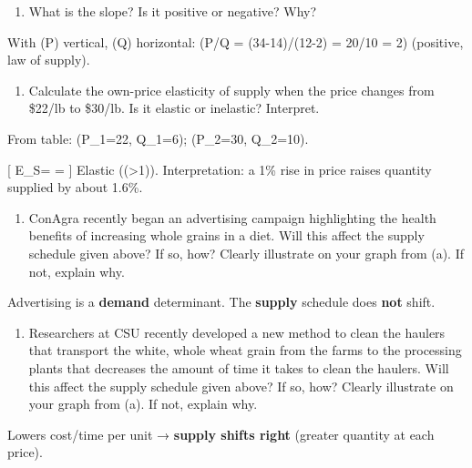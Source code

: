 \documentclass[
  letterpaper,
  DIV=11,
  numbers=noendperiod]{scrartcl}
\providecommand{\tightlist}{%
  \setlength{\itemsep}{0pt}\setlength{\parskip}{0pt}}
\begin{document}
\begin{enumerate}
\def\labelenumi{\alph{enumi}.}
\setcounter{enumi}{1}
\tightlist
\item
  What is the slope? Is it positive or negative? Why?
\end{enumerate}

With (P) vertical, (Q) horizontal: (\Delta P/\Delta Q = (34-14)/(12-2) =
20/10 = 2) (positive, law of supply).

\begin{enumerate}
\def\labelenumi{\alph{enumi}.}
\setcounter{enumi}{2}
\tightlist
\item
  Calculate the own-price elasticity of supply when the price changes
  from \$22/lb to \$30/lb. Is it elastic or inelastic? Interpret.
\end{enumerate}

From table: (P\_1=22, Q\_1=6); (P\_2=30, Q\_2=10).

{[} E\_S=
=\approx {} {]} Elastic
((\textgreater1)). Interpretation: a 1\% rise in price raises quantity
supplied by about 1.6\%.

\begin{enumerate}
\def\labelenumi{\alph{enumi}.}
\setcounter{enumi}{3}
\tightlist
\item
  ConAgra recently began an advertising campaign highlighting the health
  benefits of increasing whole grains in a diet. Will this affect the
  supply schedule given above? If so, how? Clearly illustrate on your
  graph from (a). If not, explain why.
\end{enumerate}

Advertising is a \textbf{demand} determinant. The \textbf{supply}
schedule does \textbf{not} shift.

\begin{enumerate}
\def\labelenumi{\alph{enumi}.}
\setcounter{enumi}{4}
\tightlist
\item
  Researchers at CSU recently developed a new method to clean the
  haulers that transport the white, whole wheat grain from the farms to
  the processing plants that decreases the amount of time it takes to
  clean the haulers. Will this affect the supply schedule given above?
  If so, how? Clearly illustrate on your graph from (a). If not, explain
  why.
\end{enumerate}

Lowers cost/time per unit → \textbf{supply shifts right} (greater
quantity at each price).
\end{document}
